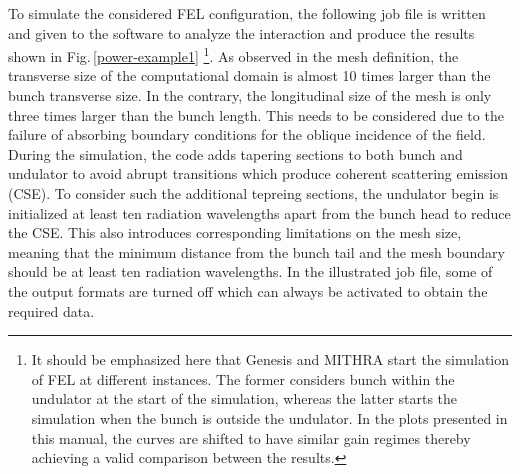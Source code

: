To simulate the considered FEL configuration, the following job file is written and given to the software to analyze the interaction and produce the results shown in Fig.\,\ref{power-example1} \footnote{It should be emphasized here that Genesis and MITHRA start the simulation of FEL at different instances. The former considers bunch within the undulator at the start of the simulation, whereas the latter starts the simulation when the bunch is outside the undulator. In the plots presented in this manual, the curves are shifted to have similar gain regimes thereby achieving a valid comparison between the results.}.
%
As observed in the mesh definition, the transverse size of the computational domain is almost 10 times larger than the bunch transverse size.
%
In the contrary, the longitudinal size of the mesh is only three times larger than the bunch length.
%
This needs to be considered due to the failure of absorbing boundary conditions for the oblique incidence of the field.
%
During the simulation, the code adds tapering sections to both bunch and undulator to avoid abrupt transitions which produce coherent scattering emission (CSE).
%
To consider such the additional tepreing sections, the undulator begin is initialized at least ten radiation wavelengths apart from the bunch head to reduce the CSE.
%
This also introduces corresponding limitations on the mesh size, meaning that the minimum distance from the bunch tail and the mesh boundary should be at least ten radiation wavelengths.
%
In the illustrated job file, some of the output formats are turned off which can always be activated to obtain the required data.
%
